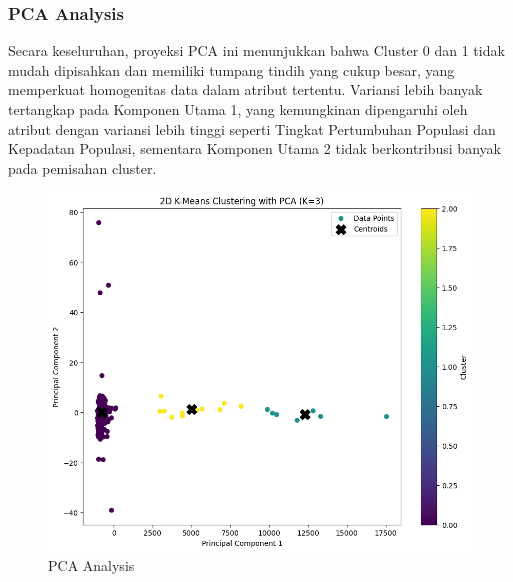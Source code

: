 \subsubsection{PCA Analysis}
Secara keseluruhan, proyeksi PCA ini menunjukkan bahwa Cluster 0 dan 1 tidak mudah dipisahkan dan memiliki tumpang tindih yang cukup besar, yang memperkuat homogenitas data dalam atribut tertentu. Variansi lebih banyak tertangkap pada Komponen Utama 1, yang kemungkinan dipengaruhi oleh atribut dengan variansi lebih tinggi seperti Tingkat Pertumbuhan Populasi dan Kepadatan Populasi, sementara Komponen Utama 2 tidak berkontribusi banyak pada pemisahan cluster.
\begin{figure}[H]
    \centering
    \includegraphics[width=0.5\linewidth]{images/pca_visual.png}
    \caption{PCA Analysis}
    \label{fig:pca_analysis}

\end{figure}
\newpage

